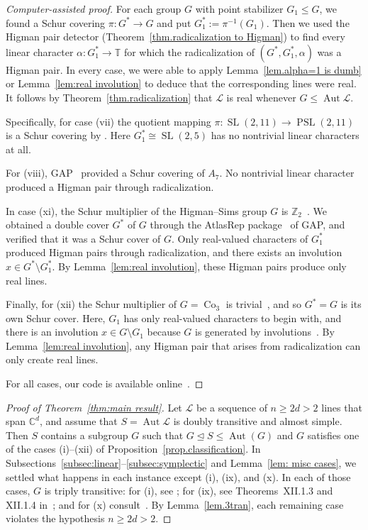\begin{proof}[Computer-assisted proof]
For each group $G$ with point stabilizer $G_1 \leq G$, we found a Schur covering $\pi \colon G^* \to G$ and put $G_1^* := \pi^{-1}(G_1)$.
Then we used the Higman pair detector (Theorem~\ref{thm.radicalization to Higman}) to find every linear character $\alpha \colon G_1^* \to \mathbb{T}$ for which the radicalization of $(G^*,G_1^*,\alpha)$ was a Higman pair.
In every case, we were able to apply Lemma~\ref{lem.alpha=1 is dumb} or Lemma~\ref{lem:real involution} to deduce that the corresponding lines were real.
It follows by Theorem~\ref{thm.radicalization} that $\mathscr{L}$ is real whenever $G \leq \operatorname{Aut} \mathscr{L}$.

Specifically, for case (vii) the quotient mapping $\pi \colon \operatorname{SL}(2,11) \to \operatorname{PSL}(2,11)$ is a Schur covering by \cite[Theorem~7.1.1]{Karpilovsky:87}.
Here $G_1^* \cong \operatorname{SL}(2,5)$ has no nontrivial linear characters at all.

For (viii), GAP~\cite{GAP} provided a Schur covering of $A_7$.
No nontrivial linear character produced a Higman pair through radicalization.

In case (xi), the Schur multiplier of the Higman--Sims group $G$ is $\mathbb{Z}_2$~\cite{McKayWales:71}.
We obtained a double cover $G^*$ of $G$ through the AtlasRep package~\cite{AtlasRep} of GAP, and verified that it was a Schur cover of $G$.
Only real-valued characters of $G_1^*$ produced Higman pairs through radicalization, and there exists an involution $x \in G^* \setminus G_1^*$.
By Lemma~\ref{lem:real involution}, these Higman pairs produce only real lines.

Finally, for (xii) the Schur multiplier of $G=\operatorname{Co}_3$ is trivial~\cite{Griess:74}, and so $G^* = G$ is its own Schur cover.
Here, $G_1$ has only real-valued characters to begin with, and there is an involution $x \in G \setminus G_1$ because $G$ is generated by involutions~\cite{MSW:94}.
By Lemma~\ref{lem:real involution}, any Higman pair that arises from radicalization can only create real lines.

For all cases, our code is available online~\cite{github}.
\end{proof}


\begin{proof}[Proof of Theorem~\ref{thm:main result}]
Let $\mathscr{L}$ be a sequence of $n \geq 2d > 2$ lines that span $\mathbb{C}^d$, and assume that $S = \operatorname{Aut} \mathscr{L}$ is doubly transitive and almost simple.
Then $S$ contains a subgroup $G$ such that $G\unlhd S\leq\operatorname{Aut}(G)$ and $G$ satisfies one of the cases (i)--(xii) of Proposition~\ref{prop.classification}.
In Subsections~\ref{subsec:linear}--\ref{subsec:symplectic} and Lemma~\ref{lem: misc cases}, we settled what happens in each instance except (i), (ix), and (x).
In each of those cases, $G$ is triply transitive: for (i), see \cite[Theorem~9.7]{Wielandt:64}; for (ix), see Theorems~XII.1.3 and XII.1.4 in~\cite{HuppertB:82:III}; and for (x) consult~\cite[Theorem~XII.1.9]{HuppertB:82:III}.
By Lemma~\ref{lem.3tran}, each remaining case violates the hypothesis $n \geq 2d > 2$.
\end{proof}

